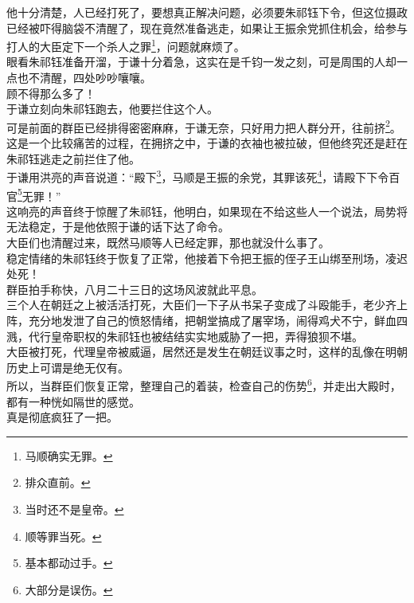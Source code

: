 \begin{multicols}{\theparacolNo}
他十分清楚，人已经打死了，要想真正解决问题，必须要朱祁钰下令，但这位摄政已经被吓得脑袋不清醒了，现在竟然准备逃走，如果让王振余党抓住机会，给参与打人的大臣定下一个杀人之罪\footnote{马顺确实无罪。}，问题就麻烦了。\\

眼看朱祁钰准备开溜，于谦十分着急，这实在是千钧一发之刻，可是周围的人却一点也不清醒，四处吵吵嚷嚷。\\

顾不得那么多了！\\

于谦立刻向朱祁钰跑去，他要拦住这个人。\\

可是前面的群臣已经排得密密麻麻，于谦无奈，只好用力把人群分开，往前挤\footnote{排众直前。}。\\

这是一个比较痛苦的过程，在拥挤之中，于谦的衣袖也被拉破，但他终究还是赶在朱祁钰逃走之前拦住了他。\\

于谦用洪亮的声音说道：“殿下\footnote{当时还不是皇帝。}，马顺是王振的余党，其罪该死\footnote{顺等罪当死。}，请殿下下令百官\footnote{基本都动过手。}无罪！”\\

这响亮的声音终于惊醒了朱祁钰，他明白，如果现在不给这些人一个说法，局势将无法稳定，于是他依照于谦的话下达了命令。\\

大臣们也清醒过来，既然马顺等人已经定罪，那也就没什么事了。\\

稳定情绪的朱祁钰终于恢复了正常，他接着下令把王振的侄子王山绑至刑场，凌迟处死！\\

群臣拍手称快，八月二十三日的这场风波就此平息。\\

三个人在朝廷之上被活活打死，大臣们一下子从书呆子变成了斗殴能手，老少齐上阵，充分地发泄了自己的愤怒情绪，把朝堂搞成了屠宰场，闹得鸡犬不宁，鲜血四溅，代行皇帝职权的朱祁钰也被结结实实地威胁了一把，弄得狼狈不堪。\\

大臣被打死，代理皇帝被威逼，居然还是发生在朝廷议事之时，这样的乱像在明朝历史上可谓是绝无仅有。\\

所以，当群臣们恢复正常，整理自己的着装，检查自己的伤势\footnote{大部分是误伤。}，并走出大殿时，都有一种恍如隔世的感觉。\\

真是彻底疯狂了一把。\\


\end{multicols}
